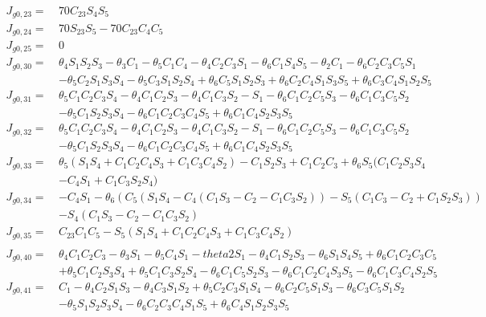 \documentclass[12pt]{article}
\begin{document}
\begin{CJK}{UTF8}{bsmi}
\begin{equation*}
\begin{split}
J_{g0,23} =\  &70C_{23}S_4S_5\\
J_{g0,24} =\  &70S_{23}S_5 - 70C_{23}C_4C_5\\
J_{g0,25} =\  &0\\
J_{g0,30} =\  &\theta _4S_1S_2S_3 - \theta _3C_1 - \theta _5C_1C_4 - \theta _4C_2C_3S_1 - \theta _6C_1S_4S_5 - \theta _2C_1 - \theta _6C_2C_3C_5S_1\\
		 	  &- \theta _5C_2S_1S_3S_4 - \theta _5C_3S_1S_2S_4 + \theta _6C_5S_1S_2S_3 + \theta _6C_2C_4S_1S_3S_5 + \theta _6C_3C_4S_1S_2S_5\\
J_{g0,31} =\  &\theta _5C_1C_2C_3S_4 - \theta _4C_1C_2S_3 - \theta _4C_1C_3S_2 - S_1 - \theta _6C_1C_2C_5S_3 - \theta _6C_1C_3C_5S_2\\
		 	  &- \theta _5C_1S_2S_3S_4 - \theta _6C_1C_2C_3C_4S_5 + \theta _6C_1C_4S_2S_3S_5\\
J_{g0,32} =\  &\theta _5C_1C_2C_3S_4 - \theta _4C_1C_2S_3 - \theta _4C_1C_3S_2 - S_1 - \theta _6C_1C_2C_5S_3 - \theta _6C_1C_3C_5S_2\\
			  &- \theta _5C_1S_2S_3S_4 - \theta _6C_1C_2C_3C_4S_5 + \theta _6C_1C_4S_2S_3S_5\\
J_{g0,33} =\  &\theta _5(S_1S_4 + C_1C_2C_4S_3 + C_1C_3C_4S_2) - C_1S_2S_3 + C_1C_2C_3 + \theta _6S_5(C_1C_2S_3S_4\\
			  &- C_4S_1 + C_1C_3S_2S_4)\\
J_{g0,34} =\  &- C_4S_1 - \theta _6(C_5(S_1S_4 - C_4(C_1S_3-C_2 - C_1C_3S_2)) - S_5(C_1C_3-C_2 + C_1S_2S_3))\\
			  &- S_4(C_1S_3-C_2 - C_1C_3S_2)\\
J_{g0,35} =\  &C_{23}C_1C_5 - S_5(S_1S_4 + C_1C_2C_4S_3 + C_1C_3C_4S_2)\\
\end{split}
\end{equation*}
\begin{equation*}
\begin{split}
J_{g0,40} =\  &\theta _4C_1C_2C_3 - \theta _3S_1 - \theta _5C_4S_1 - theta2S_1 - \theta _4C_1S_2S_3 - \theta _6S_1S_4S_5 + \theta _6C_1C_2C_3C_5\\
		 	  &+ \theta _5C_1C_2S_3S_4 + \theta _5C_1C_3S_2S_4 - \theta _6C_1C_5S_2S_3 - \theta _6C_1C_2C_4S_3S_5 - \theta _6C_1C_3C_4S_2S_5\\
J_{g0,41} =\  &C_1 - \theta _4C_2S_1S_3 - \theta _4C_3S_1S_2 + \theta _5C_2C_3S_1S_4 - \theta _6C_2C_5S_1S_3 - \theta _6C_3C_5S_1S_2 \\
		 	  &- \theta _5S_1S_2S_3S_4 - \theta _6C_2C_3C_4S_1S_5 + \theta _6C_4S_1S_2S_3S_5\\

\end{split}
\end{equation*}
\end{CJK}
\end{document}
